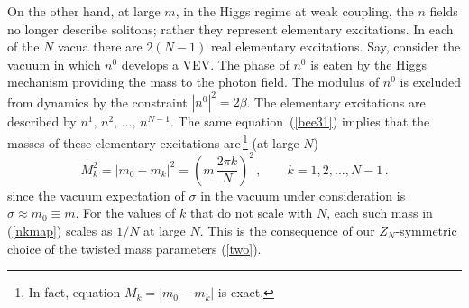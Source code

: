 \documentclass[epsfig,12pt]{article}
\def\beq{\begin{equation}}
\def\eeq{\end{equation}}
\begin{document}
On the other hand, at large $m$, in the Higgs regime at weak coupling,  the $n$ fields no longer describe solitons;
rather they represent elementary excitations. In each of the $N$ vacua
there are $2(N-1)$
real elementary excitations. Say, consider the vacuum in which $n^0$ develops a VEV.
The phase of $n^0$ is eaten by the Higgs mechanism providing the mass to the photon field.
The modulus of $n^0$ is excluded from dynamics by the constraint $\left|n^0\right|^2=2\beta$.
The elementary excitations are described by $n^1,\,n^2,\, ... ,\, n^{N-1}$.
The same equation~(\ref{bee31}) implies that the masses of these elementary excitations are\,\footnote{In fact, 
equation $M_k= \left| m_0 - m_k\right|$ is exact.}
(at large $N$)
\beq
M_k^2 = \left| m_0 - m_k\right|^2=
\left(m\, \frac{2\pi k}{N}
\right)^2
\,,\qquad k=1, 2, ..., N-1\,.
\label{nkmap}
\eeq
since the vacuum expectation of $\sigma$ in the vacuum under consideration is $\sigma\approx m_0\equiv m$.
For the values of $k$ that do not scale with $N$, each such mass in (\ref{nkmap}) scales as $1/N$ at large $N$.
This is the consequence of our $Z_N$-symmetric choice of the twisted mass parameters
(\ref{two}). 

\end{document}
